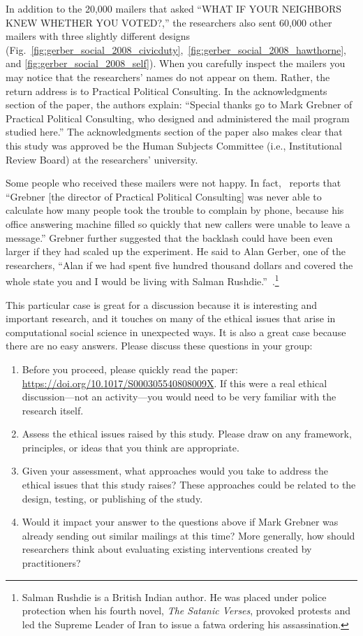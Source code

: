 \documentclass{article}
\begin{document}
In addition to the 20,000 mailers that asked ``WHAT IF YOUR NEIGHBORS KNEW WHETHER YOU VOTED?,'' the researchers also sent 60,000 other mailers with three slightly different designs (Fig.~\ref{fig:gerber_social_2008_civicduty},~\ref{fig:gerber_social_2008_hawthorne}, and \ref{fig:gerber_social_2008_self}).  When you carefully inspect the mailers you may notice that the researchers' names do not appear on them.  Rather, the return address is to Practical Political Consulting.  In the acknowledgments section of the paper, the authors explain: ``Special thanks go to Mark Grebner of Practical Political Consulting, who designed and administered the mail program studied here.''  The acknowledgments section of the paper also makes clear that this study was approved be the Human Subjects Committee (i.e., Institutional Review Board) at the researchers' university.
 
Some people who received these mailers were not happy.  In fact,~\citet[p. 198]{issenberg_victory_2012} reports that ``Grebner [the director of Practical Political Consulting] was never able to calculate how many people took the trouble to complain by phone, because his office answering machine filled so quickly that new callers were unable to leave a message.'' Grebner further suggested that the backlash could have been even larger if they had scaled up the experiment.  He said to Alan Gerber, one of the researchers, ``Alan if we had spent five hundred thousand dollars and covered the whole state you and I would be living with Salman Rushdie.''~\citep[p. 200]{issenberg_victory_2012}.\footnote{Salman Rushdie is a British Indian author. He was placed under police protection when his fourth novel, \textit{The Satanic Verses}, provoked protests and led the Supreme Leader of Iran to issue a fatwa ordering his assassination.}
 
This particular case is great for a discussion because it is interesting and important research, and it touches on many of the ethical issues that arise in computational social science in unexpected ways.  It is also a great case because there are no easy answers.  Please discuss these questions in your group:

\begin{enumerate}
\item Before you proceed, please quickly read the paper: \url{https://doi.org/10.1017/S000305540808009X}.  If this were a real ethical discussion---not an activity---you would need to be very familiar with the research itself.
\item Assess the ethical issues raised by this study.  Please draw on any framework, principles, or ideas that you think are appropriate.
\item Given your assessment, what approaches would you take to address the ethical issues that this study raises?  These approaches could be related to the design, testing, or publishing of the study.
\item Would it impact your answer to the questions above if Mark Grebner was already sending out similar mailings at this time?  More generally, how should researchers think about evaluating existing interventions created by practitioners?
\end{enumerate}
 
\end{document}

